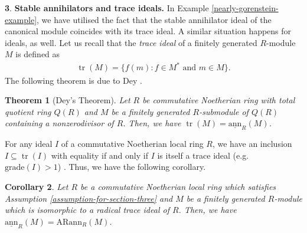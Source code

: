 \documentclass[12pt]{amsart}
\newcommand{\sann}{\underline{\mathrm{ann}}}
\newcommand{\arann}{\mathrm{ARann}}
\newtheorem{theorem}{Theorem}[section]
\newtheorem{corollary}[theorem]{Corollary}
\theoremstyle{definition}
\newtheorem{chunk}[theorem]{}
\numberwithin{equation}{theorem}
\DeclareMathOperator{\tr}{\mathrm{tr}}
\begin{document}
\begin{chunk}
    \textbf{Stable annihilators and trace ideals.} In Example \ref{nearly-gorenstein-example}, we have utilised the fact that the stable annihilator ideal of the canonical module coincides with its trace ideal. A similar situation happens for ideals, as well. Let us recall that the \textit{trace ideal} of a finitely generated $R$-module $M$ is defined as 
    \begin{align*}
    \tr(M) = \{f(m) \colon f \in M^* \text{ and } m \in M\}.
    \end{align*}
    The following theorem is due to Dey \cite[Theorem 1.1]{Dey}. 
    \begin{theorem}[Dey's Theorem]\label{Dey-theorem}
        Let $R$ be commutative Noetherian ring with total quotient ring $Q(R)$ and $M$ be a finitely generated $R$-submodule of $Q(R)$ containing a nonzerodivisor of $R$. Then, we have $\tr(M) = \sann_R(M)$.
    \end{theorem}
    For any ideal $I$ of a commutative Noetherian local ring $R$, we have an inclusion $I \subseteq \tr(I)$ with equality if and only if $I$ is itself a trace ideal (e.g. $\mathrm{grade}(I) > 1$) \cite[Proposition 2.8]{Lindo-2}. Thus, we have the following corollary.
    \begin{corollary}
        Let $R$ be a commutative Noetherian local ring which satisfies Assumption \ref{assumption-for-section-three} and $M$ be a finitely generated $R$-module which is isomorphic to a radical trace ideal of $R$. Then, we have $\sann_R(M) = \arann_R(M)$. 
    \end{corollary}
\end{chunk}
\end{document}
